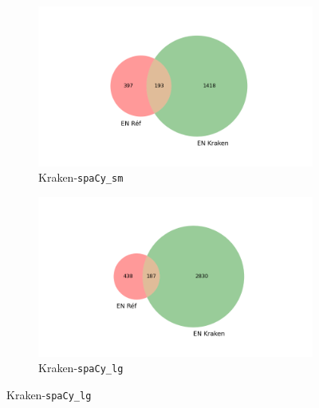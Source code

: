 \begin{figure}
\begin{minipage}{7cm}
  \begin{subfigure}{0.99\textwidth}
  \includegraphics[width=.99\textwidth]{IMAGES/ELTeC_INTERSECTIONS_spaCy3.5.1/DINIZ_Familia-Inglezia_krakenbase.txt_spacy-sm-concat.json_intersection.png} 
  \caption{Kraken-\texttt{spaCy\_sm}}
  \label{fig:}
  \end{subfigure}
  \end{minipage}
  \begin{minipage}{7cm}
  \begin{subfigure}{0.99\textwidth}
  \includegraphics[width=.99\textwidth]{IMAGES/ELTeC_INTERSECTIONS_spaCy3.5.1/DINIZ_Familia-Inglezia_krakenbase.txt_spacy-lg-concat.json_intersection.png}
   \caption{Kraken-\texttt{spaCy\_lg}}
 

\end{subfigure}
\end{minipage}
\end{figure}
